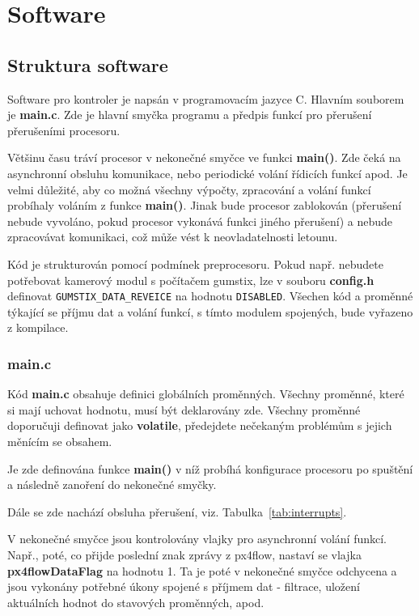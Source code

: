 \documentclass[11pt, a4paper]{article}
\begin{document}
\section{Software}

\subsection{Struktura software}

Software pro kontroler je napsán v programovacím jazyce C. Hlavním souborem je \textbf{main.c}. Zde je hlavní smyčka programu a předpis funkcí pro přerušení přerušeními procesoru.

Většinu času tráví procesor v nekonečné smyčce ve funkci \textbf{main()}. Zde čeká na asynchronní obsluhu komunikace, nebo periodické volání řídicích funkcí apod. Je velmi důležité, aby co možná všechny výpočty, zpracování a volání funkcí probíhaly voláním z funkce \textbf{main()}. Jinak bude procesor zablokován (přerušení nebude vyvoláno, pokud procesor vykonává funkci jiného přerušení) a nebude zpracovávat komunikaci, což může vést k neovladatelnosti letounu.

Kód je strukturován pomocí podmínek preprocesoru. Pokud např. nebudete potřebovat kamerový modul s počítačem gumstix, lze v souboru \textbf{config.h} definovat \texttt{GUMSTIX\_DATA\_REVEICE} na hodnotu \texttt{DISABLED}. Všechen kód a proměnné týkající se příjmu dat a volání funkcí, s tímto modulem spojených, bude vyřazeno z kompilace.

\subsubsection{main.c}

Kód \textbf{main.c} obsahuje definici globálních proměnných. Všechny proměnné, které si mají uchovat hodnotu, musí být deklarovány zde. Všechny proměnné doporučuji definovat jako \textbf{volatile}, předejdete nečekaným problémům s jejich měnícím se obsahem.

Je zde definována funkce \textbf{main()} v níž probíhá konfigurace procesoru po spuštění a následně zanoření do nekonečné smyčky.

Dále se zde nachází obsluha přerušení, viz. Tabulka~\ref{tab:interrupts}.

V nekonečné smyčce jsou kontrolovány vlajky pro asynchronní volání funkcí. Např., poté, co přijde poslední znak zprávy z px4flow, nastaví se vlajka \textbf{px4flowDataFlag} na hodnotu 1. Ta je poté v nekonečné smyčce odchycena a jsou vykonány potřebné úkony spojené s příjmem dat - filtrace, uložení aktuálních hodnot do stavových proměnných, apod.
\end{document}
